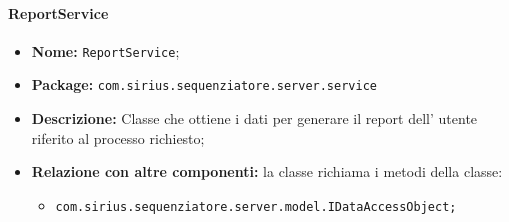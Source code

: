 \paragraph{ReportService}
	\begin{itemize}
		\item \textbf{Nome:} \texttt{ReportService};
		\item \textbf{Package:} \texttt{com.sirius.sequenziatore.server.service}
		\item \textbf{Descrizione:} Classe che ottiene i dati per generare il report dell' utente riferito al processo richiesto;
		\item \textbf{Relazione con altre componenti:} la classe richiama i metodi della classe:
		\begin{itemize}
			\item \texttt{com.sirius.sequenziatore.server.model.IDataAccessObject;}
		\end{itemize}
	\end{itemize}

	